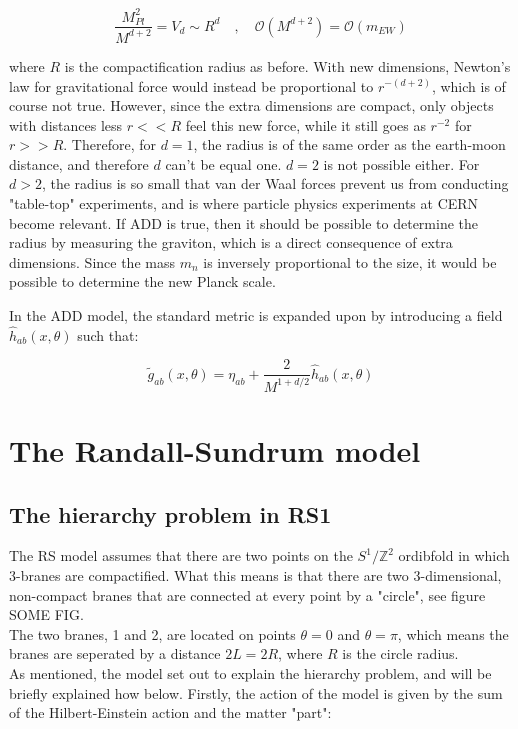 \documentclass[11pt,a4paper]{article}
\begin{document}
\begin{equation}
	\frac{M_{Pl}^2}{M^{d+2}} = V_d \sim R^d	\quad,\quad \mathcal{O}(M^{d+2}) = \mathcal{O}(m_{EW})
\end{equation}

where $R$ is the compactification radius as before. With new dimensions, Newton's law for gravitational force would instead be proportional to $r^{-(d+2)}$, which is of course not true. However, since the extra dimensions are compact, only objects with distances less $r<<R$ feel this new force, while it still goes as $r^{-2}$ for $r>>R$. Therefore, for $d=1$, the radius is of the same order as the earth-moon distance, and therefore $d$ can't be equal one. $d=2$ is not possible either. For $d>2$, the radius is so small that van der Waal forces prevent us from conducting "table-top" experiments, and is where particle physics experiments at CERN become relevant. If ADD is true, then it should be possible to determine the radius by measuring the graviton, which is a direct consequence of extra dimensions. Since the mass $m_n$ is inversely proportional to the size, it would be possible to determine the new Planck scale.

In the ADD model, the standard metric is expanded upon by introducing a field $\hat{h}_{ab}(x,\theta)$ such that:

\begin{equation}
	\tilde{g}_{ab}(x,\theta) = \eta_{ab} + \frac{2}{M^{1+d/2}}\hat{h}_{ab}(x,\theta)
\end{equation}



\section{The Randall-Sundrum model}
\subsection{The hierarchy problem in RS1}
The RS model assumes that there are two points on the $S^1/\mathbb{Z}^2$ ordibfold in which 3-branes are compactified. What this means is that there are two 3-dimensional, non-compact branes that are connected at every point by a "circle", see figure SOME FIG.\\



The two branes, 1 and 2, are located on points $\theta = 0$ and $\theta = \pi$, which means the branes are seperated by a distance $2L = 2R$, where $R$ is the circle radius.\\
As mentioned, the model set out to explain the hierarchy problem, and will be briefly explained how below. Firstly, the action of the model is given by the sum of the Hilbert-Einstein action and the matter "part":
\end{document}
